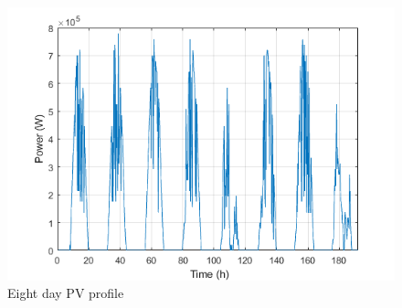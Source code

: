 

\begin{figure}[!ht]
    \centering
    \includegraphics[width = 0.6\linewidth]{figs/A8/PV_PROFILE.png}
    \caption{Eight day PV profile}
    \label{fig:PV_PROFILE_8}
\end{figure}


